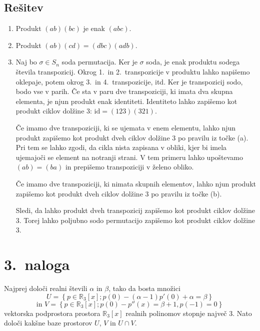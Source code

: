 \documentclass[a4,11pt]{article}
\newcommand{\R}{\mathbb{R}}
\begin{document}
\subsection*{Rešitev}
\begin{enumerate}[label=(\alph*)]
    \item Produkt \(\left(ab\right)\left(bc\right)\) je enak \(\left(abc\right)\).
    \item Produkt \(\left(ab\right)\left(cd\right) = \left(dbc\right)\left(adb\right)\).
    \item Naj bo \(\sigma \in S_n\) soda permutacija. Ker je \(\sigma\) soda, je enak produktu sodega števila
    transpozicij. Okrog 1.~in 2.~transpozicije v produktu lahko napišemo oklepaje, 
    potem okrog 3.~in 4.~transpozicije, itd. Ker je transpozicij sodo, bodo 
    vse v parih. Če sta v paru dve transpoziciji, ki imata dva skupna elementa,
    je njun produkt enak identiteti. Identiteto lahko zapišemo kot produkt ciklov dolžine 3:
    \(\mathrm{id} = \left(1 2 3\right)\left(3 2 1\right)\). 
    
    Če imamo dve transpoziciji,
    ki se ujemata v enem elementu, lahko njun produkt zapišemo kot produkt dveh ciklov dolžine 3
    po pravilu iz točke (a). Pri tem se lahko zgodi, da cikla nista zapisana v obliki, 
    kjer bi imela ujemajoči se element na notranji strani. V tem primeru lahko upoštevamo
    \(\left(ab\right) = \left(ba\right)\) in prepišemo transpoziciji v želeno obliko.

    Če imamo dve transpoziciji, ki nimata skupnih elementov, lahko njun produkt zapišemo kot produkt
    dveh ciklov dolžine 3 po pravilu iz točke (b).

    Sledi, da lahko produkt dveh transpozicij zapišemo kot produkt ciklov dolžine 3.
    Torej lahko poljubno sodo permutacijo zapišemo kot produkt ciklov dolžine 3.
\end{enumerate}

\section*{3.~naloga}
    Najprej določi realni števili \(\alpha\) in \(\beta\), tako da bosta množici
    \[
        U = \left\{p \in \R_3\left[x\right]; p\left(0\right) - \left(\alpha - 1\right)
        p'\left(0\right) + \alpha = \beta\right\}
    \]
    \[
        \text{in } V = \left\{p \in \R_3\left[x\right]; p\left(0\right) - p''\left(x\right)
        = \beta + 1, p\left(-1\right) = 0\right\}
    \]
    vektorska podprostora prostora \(\R_3\left[x\right]\) realnih polinomov stopnje največ 3.
    Nato določi kakšne baze prostorov \(U\), \(V\) in \(U \cap V\).
\end{document}
